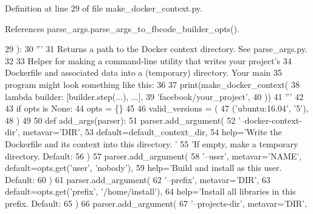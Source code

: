 Definition at line 29 of file make\+\_\+docker\+\_\+context.\+py.



References parse\+\_\+args.\+parse\+\_\+args\+\_\+to\+\_\+fbcode\+\_\+builder\+\_\+opts().


\begin{DoxyCode}
29 ):
30     \textcolor{stringliteral}{'''}
31 \textcolor{stringliteral}{    Returns a path to the Docker context directory. See parse\_args.py.}
32 \textcolor{stringliteral}{}
33 \textcolor{stringliteral}{    Helper for making a command-line utility that writes your project's}
34 \textcolor{stringliteral}{    Dockerfile and associated data into a (temporary) directory.  Your main}
35 \textcolor{stringliteral}{    program might look something like this:}
36 \textcolor{stringliteral}{}
37 \textcolor{stringliteral}{        print(make\_docker\_context(}
38 \textcolor{stringliteral}{            lambda builder: [builder.step(...), ...],}
39 \textcolor{stringliteral}{            'facebook/your\_project',}
40 \textcolor{stringliteral}{        ))}
41 \textcolor{stringliteral}{    '''}
42 
43     \textcolor{keywordflow}{if} opts \textcolor{keywordflow}{is} \textcolor{keywordtype}{None}:
44         opts = \{\}
45 
46     valid\_versions = (
47         (\textcolor{stringliteral}{'ubuntu:16.04'}, \textcolor{stringliteral}{'5'}),
48     )
49 
50     \textcolor{keyword}{def }add\_args(parser):
51         parser.add\_argument(
52             \textcolor{stringliteral}{'--docker-context-dir'}, metavar=\textcolor{stringliteral}{'DIR'},
53             default=default\_context\_dir,
54             help=\textcolor{stringliteral}{'Write the Dockerfile and its context into this directory. '}
55                 \textcolor{stringliteral}{'If empty, make a temporary directory. Default: %
56         )
57         parser.add\_argument(
58             \textcolor{stringliteral}{'--user'}, metavar=\textcolor{stringliteral}{'NAME'}, default=opts.get(\textcolor{stringliteral}{'user'}, \textcolor{stringliteral}{'nobody'}),
59             help=\textcolor{stringliteral}{'Build and install as this user. Default: %
60         )
61         parser.add\_argument(
62             \textcolor{stringliteral}{'--prefix'}, metavar=\textcolor{stringliteral}{'DIR'},
63             default=opts.get(\textcolor{stringliteral}{'prefix'}, \textcolor{stringliteral}{'/home/install'}),
64             help=\textcolor{stringliteral}{'Install all libraries in this prefix. Default: %
65         )
66         parser.add\_argument(
67             \textcolor{stringliteral}{'--projects-dir'}, metavar=\textcolor{stringliteral}{'DIR'},
}}}
\end{DoxyCode}
